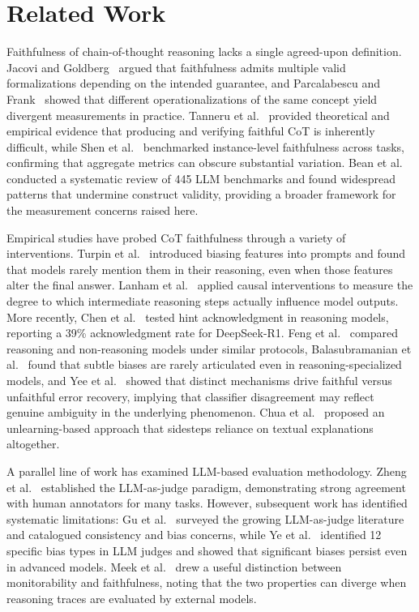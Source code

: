 \section{Related Work}

Faithfulness of chain-of-thought reasoning lacks a single agreed-upon definition. Jacovi and Goldberg~\cite{jacovi2020faithfulness} argued that faithfulness admits multiple valid formalizations depending on the intended guarantee, and Parcalabescu and Frank~\cite{parcalabescu2023measuring} showed that different operationalizations of the same concept yield divergent measurements in practice. Tanneru et al.~\cite{tanneru2024hardness} provided theoretical and empirical evidence that producing and verifying faithful CoT is inherently difficult, while Shen et al.~\cite{shen2025faithcotbench} benchmarked instance-level faithfulness across tasks, confirming that aggregate metrics can obscure substantial variation. Bean et al.~\cite{bean2025measuring} conducted a systematic review of 445 LLM benchmarks and found widespread patterns that undermine construct validity, providing a broader framework for the measurement concerns raised here.

Empirical studies have probed CoT faithfulness through a variety of interventions. Turpin et al.~\cite{turpin2023unfaithful} introduced biasing features into prompts and found that models rarely mention them in their reasoning, even when those features alter the final answer. Lanham et al.~\cite{lanham2023measuring} applied causal interventions to measure the degree to which intermediate reasoning steps actually influence model outputs. More recently, Chen et al.~\cite{chen2025reasoning} tested hint acknowledgment in reasoning models, reporting a 39\% acknowledgment rate for DeepSeek-R1. Feng et al.~\cite{feng2025more} compared reasoning and non-reasoning models under similar protocols, Balasubramanian et al.~\cite{balasubramanian2025closer} found that subtle biases are rarely articulated even in reasoning-specialized models, and Yee et al.~\cite{yee2024dissociation} showed that distinct mechanisms drive faithful versus unfaithful error recovery, implying that classifier disagreement may reflect genuine ambiguity in the underlying phenomenon. Chua et al.~\cite{chua2025unlearning} proposed an unlearning-based approach that sidesteps reliance on textual explanations altogether.

A parallel line of work has examined LLM-based evaluation methodology. Zheng et al.~\cite{zheng2023judging} established the LLM-as-judge paradigm, demonstrating strong agreement with human annotators for many tasks. However, subsequent work has identified systematic limitations: Gu et al.~\cite{gu2024survey} surveyed the growing LLM-as-judge literature and catalogued consistency and bias concerns, while Ye et al.~\cite{ye2024justice} identified 12 specific bias types in LLM judges and showed that significant biases persist even in advanced models. Meek et al.~\cite{stickland2025monitorability} drew a useful distinction between monitorability and faithfulness, noting that the two properties can diverge when reasoning traces are evaluated by external models.

